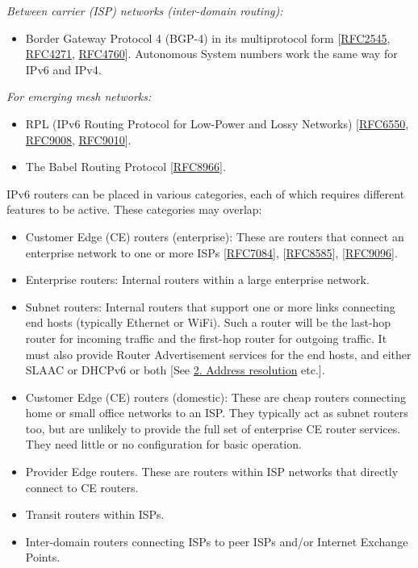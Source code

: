 \documentclass[
]{article}
\providecommand{\tightlist}{%
  \setlength{\itemsep}{0pt}\setlength{\parskip}{0pt}}
\begin{document}
\emph{Between carrier (ISP) networks (inter-domain routing):}

\begin{itemize}
\tightlist
\item
  Border Gateway Protocol 4 (BGP-4) in its multiprotocol form
  {[}\href{https://www.rfc-editor.org/info/rfc2545}{RFC2545},
  \href{https://www.rfc-editor.org/info/rfc4271}{RFC4271},
  \href{https://www.rfc-editor.org/info/rfc4760}{RFC4760}{]}. Autonomous
  System numbers work the same way for IPv6 and IPv4.
\end{itemize}

\emph{For emerging mesh networks:}

\begin{itemize}
\item
  RPL (IPv6 Routing Protocol for Low-Power and Lossy Networks)
  {[}\href{https://www.rfc-editor.org/info/rfc6550}{RFC6550},
  \href{https://www.rfc-editor.org/info/rfc9008}{RFC9008},
  \href{https://www.rfc-editor.org/info/rfc9010}{RFC9010}{]}.
\item
  The Babel Routing Protocol
  {[}\href{https://www.rfc-editor.org/info/rfc8966}{RFC8966}{]}.
\end{itemize}

IPv6 routers can be placed in various categories, each of which requires
different features to be active. These categories may overlap:

\begin{itemize}
\item
  Customer Edge (CE) routers (enterprise): These are routers that
  connect an enterprise network to one or more ISPs
  {[}\href{https://www.rfc-editor.org/info/rfc7084}{RFC7084}{]},
  {[}\href{https://www.rfc-editor.org/info/rfc8585}{RFC8585}{]},
  {[}\href{https://www.rfc-editor.org/info/rfc9096}{RFC9096}{]}.
\item
  Enterprise routers: Internal routers within a large enterprise
  network.
\item
  Subnet routers: Internal routers that support one or more links
  connecting end hosts (typically Ethernet or WiFi). Such a router will
  be the last-hop router for incoming traffic and the first-hop router
  for outgoing traffic. It must also provide Router Advertisement
  services for the end hosts, and either SLAAC or DHCPv6 or both {[}See
  \hyperref[address-resolution]{2. Address resolution} etc.{]}.
\item
  Customer Edge (CE) routers (domestic): These are cheap routers
  connecting home or small office networks to an ISP. They typically act
  as subnet routers too, but are unlikely to provide the full set of
  enterprise CE router services. They need little or no configuration
  for basic operation.
\item
  Provider Edge routers. These are routers within ISP networks that
  directly connect to CE routers.
\item
  Transit routers within ISPs.
\item
  Inter-domain routers connecting ISPs to peer ISPs and/or Internet
  Exchange Points.
\end{itemize}
\end{document}
